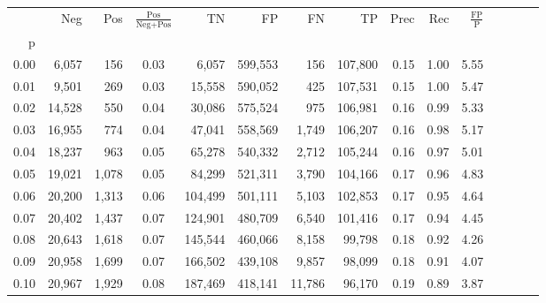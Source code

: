 \begin{tabular}{rrrcrrrrrrrrrrr}
\toprule
{} &     Neg &    Pos & $\frac{\text{Pos}}{\text{Neg}+\text{Pos}}$ &       TN &       FP &       FN &       TP &  Prec &   Rec & $\frac{\text{FP}}{\text{P}}$ \\
p    &         &        &                                            &          &          &          &          &       &       &                              \\
\midrule
0.00 &   6,057 &    156 &                                       0.03 &    6,057 &  599,553 &      156 &  107,800 &  0.15 &  1.00 &                         5.55 \\
0.01 &   9,501 &    269 &                                       0.03 &   15,558 &  590,052 &      425 &  107,531 &  0.15 &  1.00 &                         5.47 \\
0.02 &  14,528 &    550 &                                       0.04 &   30,086 &  575,524 &      975 &  106,981 &  0.16 &  0.99 &                         5.33 \\
0.03 &  16,955 &    774 &                                       0.04 &   47,041 &  558,569 &    1,749 &  106,207 &  0.16 &  0.98 &                         5.17 \\
0.04 &  18,237 &    963 &                                       0.05 &   65,278 &  540,332 &    2,712 &  105,244 &  0.16 &  0.97 &                         5.01 \\
0.05 &  19,021 &  1,078 &                                       0.05 &   84,299 &  521,311 &    3,790 &  104,166 &  0.17 &  0.96 &                         4.83 \\
0.06 &  20,200 &  1,313 &                                       0.06 &  104,499 &  501,111 &    5,103 &  102,853 &  0.17 &  0.95 &                         4.64 \\
0.07 &  20,402 &  1,437 &                                       0.07 &  124,901 &  480,709 &    6,540 &  101,416 &  0.17 &  0.94 &                         4.45 \\
0.08 &  20,643 &  1,618 &                                       0.07 &  145,544 &  460,066 &    8,158 &   99,798 &  0.18 &  0.92 &                         4.26 \\
0.09 &  20,958 &  1,699 &                                       0.07 &  166,502 &  439,108 &    9,857 &   98,099 &  0.18 &  0.91 &                         4.07 \\
0.10 &  20,967 &  1,929 &                                       0.08 &  187,469 &  418,141 &   11,786 &   96,170 &  0.19 &  0.89 &                         3.87 \\

\end{tabular}
